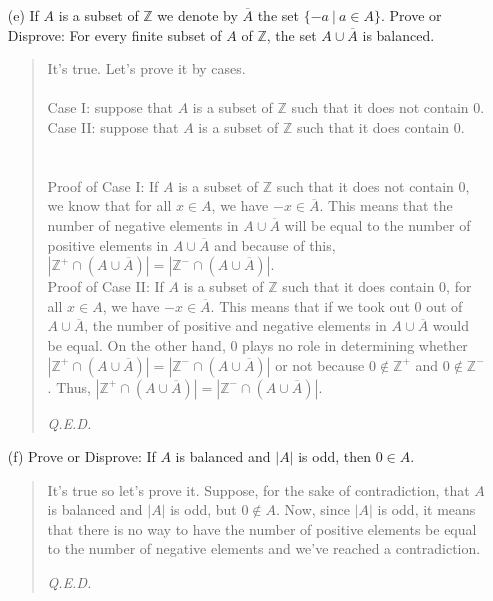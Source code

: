 \documentclass[12pt, a4paper]{article}                      %
\begin{document}
\begin{itemize}
\begin{itemize}
\item[]

\item[(e)]
If $A$ is a subset of $\mathbb{Z}$ we denote by $\overline{A}$ the set $\{-a \ | \ a \in A\}$. Prove or Disprove:
For every finite subset of $A$ of $\mathbb{Z}$, the set $A \cup \overline{A}$ is balanced.
\begin{quote}
It's true. Let's prove it by cases.\\\\
Case I: suppose that $A$ is a subset of $\mathbb{Z}$ such that it does not contain 0.\\
Case II: suppose that $A$ is a subset of $\mathbb{Z}$ such that it does contain 0.
\\\\\\
Proof of Case I: If $A$ is a subset of $\mathbb{Z}$ such that it does not contain 0, we know that for all $x \in A$,
we have $-x \in \overline{A}$. This means that the number of negative elements in $A \cup \overline{A}$
will be equal to the number of positive elements in $A \cup \overline{A}$ and because of this,
$|\mathbb{Z}^+ \cap (A \cup \overline{A})| = |\mathbb{Z}^- \cap (A \cup \overline{A})|$.\\

Proof of Case II: If $A$ is a subset of $\mathbb{Z}$ such that it does contain 0, for all $x \in A$,
we have $-x \in \overline{A}$. This means that if we took out 0 out of $A \cup \overline{A}$, the number
of positive and negative elements in $A \cup \overline{A}$ would be equal. On the other hand, 0 plays no role
in determining whether $|\mathbb{Z}^+ \cap (A \cup \overline{A})| = |\mathbb{Z}^- \cap (A \cup \overline{A})|$
or not because $0 \notin \mathbb{Z}^+$ and $0 \notin \mathbb{Z}^-$. Thus, $|\mathbb{Z}^+ \cap (A \cup \overline{A})| = |\mathbb{Z}^- \cap (A \cup \overline{A})|$.
\begin{flushright}
\textit{Q.E.D.}
\end{flushright}
\end{quote}

\item[]

\item[(f)]
Prove or Disprove: If $A$ is balanced and $|A|$ is odd, then $0 \in A$.
\begin{quote}
It's true so let's prove it. Suppose, for the sake of contradiction, that $A$ is balanced
and $|A|$ is odd, but $0 \notin A$. Now, since $|A|$ is odd, it means that there is no way
to have the number of positive elements be equal to the number of negative elements and we've
reached a contradiction.
\begin{flushright}
\textit{Q.E.D.}
\end{flushright}
\end{quote}
\end{itemize}


\end{itemize}
\end{document}
